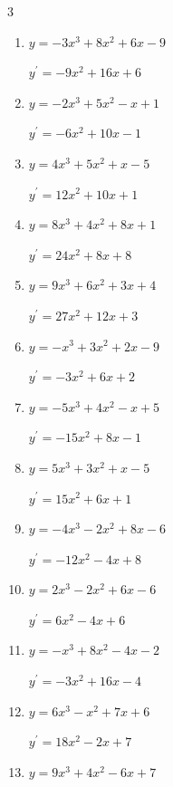\begin{multicols}{3}
\begin{enumerate}
        $\displaystyle y^{\prime}=-15x^{2}+6x+8$

  \item $y=-3x^{3}+8x^{2}+6x-9$

        $\displaystyle y^{\prime}=-9x^{2}+16x+6$

  \item $y=-2x^{3}+5x^{2}-x+1$

        $\displaystyle y^{\prime}=-6x^{2}+10x-1$

  \item $y=4x^{3}+5x^{2}+x-5$

        $\displaystyle y^{\prime}=12x^{2}+10x+1$

\columnbreak %

  \item $y=8x^{3}+4x^{2}+8x+1$

        $\displaystyle y^{\prime}=24x^{2}+8x+8$

  \item $y=9x^{3}+6x^{2}+3x+4$

        $\displaystyle y^{\prime}=27x^{2}+12x+3$

  \item $y=-x^{3}+3x^{2}+2x-9$

        $\displaystyle y^{\prime}=-3x^{2}+6x+2$

  \item $y=-5x^{3}+4x^{2}-x+5$

        $\displaystyle y^{\prime}=-15x^{2}+8x-1$

  \item $y=5x^{3}+3x^{2}+x-5$

        $\displaystyle y^{\prime}=15x^{2}+6x+1$

  \item $y=-4x^{3}-2x^{2}+8x-6$

        $\displaystyle y^{\prime}=-12x^{2}-4x+8$

  \item $y=2x^{3}-2x^{2}+6x-6$

        $\displaystyle y^{\prime}=6x^{2}-4x+6$

  \item $y=-x^{3}+8x^{2}-4x-2$

        $\displaystyle y^{\prime}=-3x^{2}+16x-4$

  \item $y=6x^{3}-x^{2}+7x+6$

        $\displaystyle y^{\prime}=18x^{2}-2x+7$

  \item $y=9x^{3}+4x^{2}-6x+7$


\end{enumerate}
\end{multicols}

